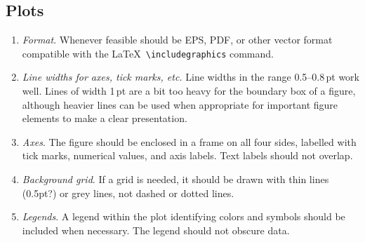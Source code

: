 \documentclass[letterpaper,11pt]{article}
\begin{document}
\subsection{Plots}

\begin{enumerate}
\item {\it Format\/}. Whenever feasible should be EPS, PDF, or other vector format
compatible with the La\TeX\ \verb|\includegraphics| command. 

\item {\it Line widths for axes, tick marks, etc.\/} Line widths in the range 0.5--0.8\,pt 
 work well.  Lines of width 1\,pt are a bit too heavy for
the boundary box of a figure, although heavier lines can be used when
appropriate for important figure elements to make a clear presentation.  

\item {\it Axes\/}. The figure should be enclosed in a frame on all four
sides, labelled with tick marks, numerical values, and axis labels.  Text
labels should not overlap.


\item {\it Background grid\/}.  If a grid is needed, it should be drawn with
thin lines (0.5pt?) or grey lines, not dashed or dotted lines.

\item {\it Legends\/}.  A legend within the plot identifying colors and
symbols should be included when necessary.  The legend should not obscure data.
\end{enumerate}
\end{document}
